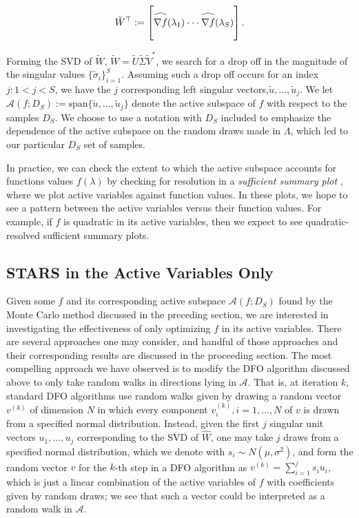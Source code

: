 \documentclass{amsart}
\newcommand{\A}{\mathcal{A}}
\newcommand\reallywidehat[1]{\arraycolsep=0pt\relax%
\begin{array}{c}
\stretchto{
  \scaleto{
    \scalerel*[\widthof{\ensuremath{#1}}]{\kern-.5pt\bigwedge\kern-.5pt}
    {\rule[-\textheight/2]{1ex}{\textheight}} %
  }{\textheight} %
}{0.5ex}\\           %
#1\\                 %
\rule{-1ex}{0ex}
\end{array}
}
\begin{document}
\begin{equation} \label{eq:9}
\tilde{W}^\top:=\begin{bmatrix}
\reallywidehat{\nabla f}(\lambda_1)
\cdot \cdot \cdot
\reallywidehat{\nabla f}(\lambda_S)\\
\end{bmatrix}.
\end{equation}  

Forming the SVD of $\tilde{W}$, $\tilde{W}=\tilde{U}\tilde{\Sigma}\tilde{V}^*$, we search for a drop off in the magnitude of the singular values $\{\tilde{\sigma}_i\}_{i=1}^S$. Assuming such a drop off occurs for an index $j:1<j<S$, we have the $j$ corresponding left singular vectors,$ \tilde{u},\ldots,\tilde{u}_{j}$.  We let $\A\left(f; D_S \right):=\text{span}\{\tilde{u},\ldots,\tilde{u}_{j}\}$ denote the active subspace of $f$ with respect to the samples $D_S$. We choose to use a notation with $D_S$ included to emphasize the dependence of the active subspace on the random draws made in $\Lambda$, which led to our particular $D_S$ set of samples.

In practice, we can check the extent to which the active subspace accounts for functions values $f(\lambda)$ 
by checking for resolution in a \emph{sufficient summary plot} \cite{Constantine2015}, where we plot active variables against function values. In these plots, we hope to see a pattern between the active variables versus their function values. For example, if $f$ is quadratic in its active variables, then we expect to see quadratic-resolved sufficient summary plots.











\subsection{STARS in the Active Variables Only} Given some $f$ and its corresponding active subspace $\A(f;D_S)$ found by the Monte Carlo method discussed in the preceding section, we are interested in investigating the effectiveness of only optimizing $f$ in its active variables. There are several approaches one may consider, and handful of those approaches and their corresponding results are discussed in the proceeding section. The most compelling approach we have observed is to modify the DFO algorithm discussed above to only take random walks in directions lying in $\A$. That is, at iteration $k$, standard DFO algorithms \cite{CW} use random walks given by drawing a random vector $v^{(k)}$ of dimension $N$ in which every component $v_i^{(k)},i=1,\ldots,N$ of $v$ is  drawn from a specified normal distribution. Instead, given the first $j$ singular unit vectors $u_1,\ldots,u_j$ corresponding to the SVD of $\hat{W}$, one may take $j$ draws from a specified normal distribution, which we denote with $s_i\sim N(\mu,\sigma^2)$, and form the random vector $v$ for the $k$-th step in a DFO algorithm as $v^{(k)}=\sum_{i=1}^js_iu_i$, which is just a linear combination of the active variables of $f$ with coefficients given by random draws; we see that such a vector could be interpreted as a random walk in $\A$.
\end{document}

